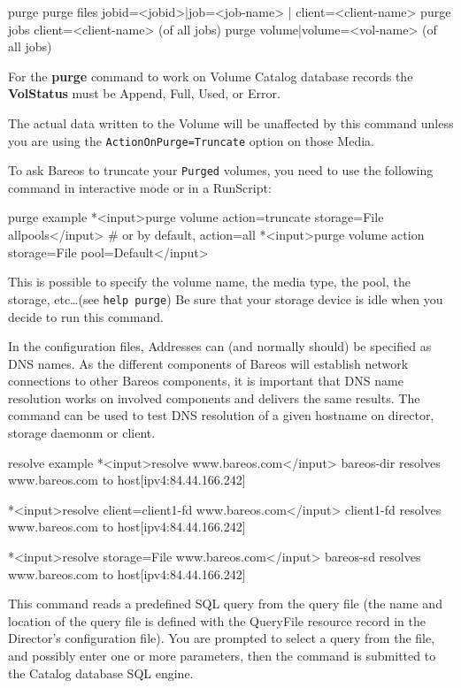 \begin{description}
\begin{bconsole}{purge}
purge files jobid=<jobid>|job=<job-name> | client=<client-name>
purge jobs client=<client-name> (of all jobs)
purge volume|volume=<vol-name> (of all jobs)
\end{bconsole}

For the {\bf purge} command to work on Volume Catalog database  records the
{\bf VolStatus}  must be Append, Full, Used, or Error.

The actual data written to the Volume will be unaffected by this command unless
you are using the \texttt{ActionOnPurge=Truncate} option on those Media.

To ask Bareos to truncate your \texttt{Purged} volumes, you need to use the
following command in interactive mode or in a RunScript:
\begin{bconsole}{purge example}
*<input>purge volume action=truncate storage=File allpools</input>
# or by default, action=all
*<input>purge volume action storage=File pool=Default</input>
\end{bconsole}

This is possible to specify the volume name, the media type, the pool, the
storage, etc\dots (see \texttt{help purge}) Be sure that your storage device is
idle when you decide to run this command.

\item [resolve]
    In the configuration files, Addresses can (and normally should) be specified as DNS names.
    As the different components of Bareos will establish network connections to other Bareos components,
    it is important that DNS name resolution works on involved components and delivers the same results.
    The  command can be used to test DNS resolution of a given hostname 
    on director, storage daemonm or client.

\begin{bconsole}{resolve example}
*<input>resolve www.bareos.com</input>
bareos-dir resolves www.bareos.com to host[ipv4:84.44.166.242]

*<input>resolve client=client1-fd www.bareos.com</input>
client1-fd resolves www.bareos.com to host[ipv4:84.44.166.242]

*<input>resolve storage=File www.bareos.com</input>
bareos-sd resolves www.bareos.com to host[ipv4:84.44.166.242]
\end{bconsole}


\item [query]
   This command reads a predefined SQL query from  the query file (the name and
   location of the  query file is defined with the QueryFile resource record in
   the Director's configuration file). You are prompted to select  a query from
   the file, and possibly enter one or more parameters,  then the command is
   submitted to the Catalog database SQL engine.


\end{description}
